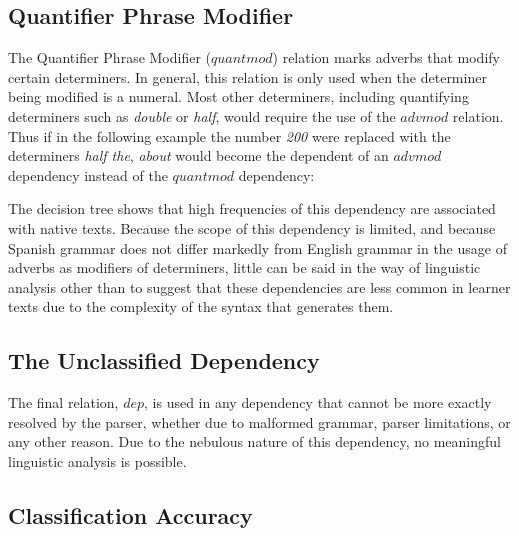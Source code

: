 \documentclass[main.tex]{subfiles}
\begin{document}
\subsection{Quantifier Phrase Modifier}

The Quantifier Phrase Modifier ($quantmod$) relation marks adverbs that modify certain determiners. In general, this relation is only used when the determiner being modified is a numeral. Most other determiners, including quantifying determiners such as \textit{double} or \textit{half}, would require the use of the $advmod$ relation. Thus if in the following example \citet{typed-deps-manual} the number \textit{200} were replaced with the determiners \textit{half the}, \textit{about} would become the dependent of an $advmod$ dependency instead of the $quantmod$ dependency:
\newline\newline{}
\newline

The decision tree shows that high frequencies of this dependency are associated with native texts. Because the scope of this dependency is limited, and because Spanish grammar does not differ markedly from English grammar in the usage of adverbs as modifiers of determiners, little can be said in the way of linguistic analysis other than to suggest that these dependencies are less common in learner texts due to the complexity of the syntax that generates them.

\subsection{The Unclassified Dependency}

The final relation, $dep$, is used in any dependency that cannot be more exactly resolved by the parser, whether due to malformed grammar, parser limitations, or any other reason. Due to the nebulous nature of this dependency, no meaningful linguistic analysis is possible. 

\subsection{Classification Accuracy}
\end{document}
